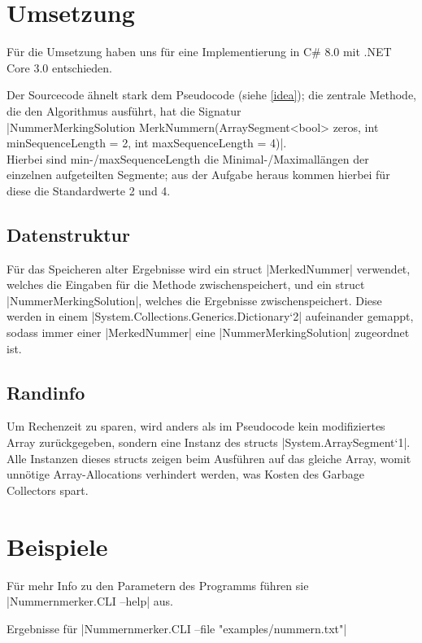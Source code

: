 \documentclass[a4paper,10pt,ngerman]{scrartcl}
\begin{document}
\section{Umsetzung}

Für die Umsetzung haben uns für eine Implementierung in C\# 8.0 mit
.NET Core 3.0 entschieden.

Der Sourcecode ähnelt stark dem Pseudocode (siehe \cref{idea});
die zentrale Methode, die den Algorithmus ausführt, hat die Signatur\\
|NummerMerkingSolution MerkNummern(ArraySegment<bool> zeros, int minSequenceLength = 2, int maxSequenceLength = 4)|.\\
Hierbei sind min-/maxSequenceLength die Minimal-/Maximallängen
der einzelnen aufgeteilten Segmente; aus der Aufgabe heraus kommen hierbei
für diese die Standardwerte 2 und 4.

\subsection{Datenstruktur}

Für das Speicheren alter Ergebnisse wird ein struct |MerkedNummer|
verwendet, welches die Eingaben für die Methode zwischenspeichert,
und ein struct |NummerMerkingSolution|, welches die Ergebnisse
zwischenspeichert. Diese werden in einem
|System.Collections.Generics.Dictionary`2| aufeinander gemappt,
sodass immer einer |MerkedNummer| eine |NummerMerkingSolution|
zugeordnet ist.

\subsection{Randinfo}

Um Rechenzeit zu sparen, wird anders als im Pseudocode kein modifiziertes
Array zurückgegeben, sondern eine Instanz des structs |System.ArraySegment`1|.
Alle Instanzen dieses structs zeigen beim Ausführen auf das gleiche Array,
womit unnötige Array-Allocations verhindert werden, was Kosten des
Garbage Collectors spart.

\section{Beispiele}

Für mehr Info zu den Parametern des Programms führen sie |Nummernmerker.CLI --help| aus.

Ergebnisse für |Nummernmerker.CLI --file "examples/nummern.txt"|
\end{document}
